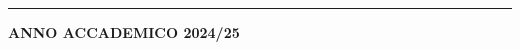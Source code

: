 \begin{titlepage}
\begin{center}
    
    \rule{\linewidth}{0.4pt}

    

    {\large \textbf{ANNO ACCADEMICO 2024/25} \par}

    \vspace*{0.5cm}


                
    \end{center}
\end{titlepage}